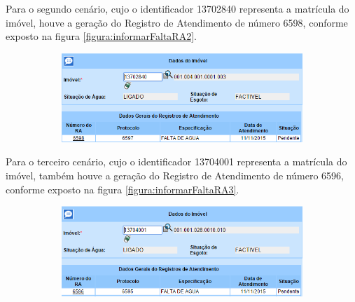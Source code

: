 	
Para o segundo cenário, cujo o identificador 13702840 representa a matrícula do imóvel, houve a geração do Registro de Atendimento de número 6598, conforme exposto na figura \ref{figura:informarFaltaRA2}.	
		
\begin{figure}[H]
	\centering
	\caption{\textbf{Informar Falta de Água - RA gerado para o Cenário 2}}
	\label{figura:informarFaltaRA2}
	\begin{subfigure}[H]{\textwidth}
		\centering
		\includegraphics{figuras/cenarios/informar_falta_agua/resultado_2.PNG}
	\end{subfigure}
\end{figure}

Para o terceiro cenário, cujo o identificador 13704001 representa a matrícula do imóvel, também houve a geração do Registro de Atendimento de número 6596, conforme exposto na figura \ref{figura:informarFaltaRA3}.	

\begin{figure}[H]
	\centering
	\caption{\textbf{Informar Falta de Água - RA gerado para o Cenário 3}}
	\label{figura:informarFaltaRA3}
	\begin{subfigure}[H]{\textwidth}
		\centering
		\includegraphics{figuras/cenarios/informar_falta_agua/resultado_3.PNG}
	\end{subfigure}
\end{figure}

